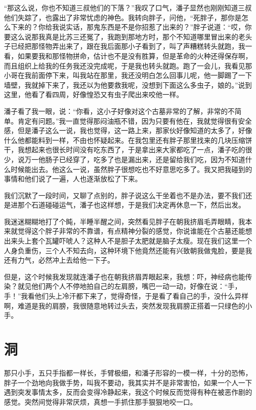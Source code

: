 “那这么说，你也不知道三叔他们的下落？”我叹了口气，潘子显然也刚刚知道三叔他们失踪了，也露出了非常忧虑的神色。我转向胖子，问他，“死胖子，那你是怎么下来的？你给我说实话，那鬼东西是不是你招惹了出来的？”胖子说道：“哎，你要这么说那我真是比苏三还冤了，我跑到那地方时，那个不知道哪里冒出来的老头子已经把那怪物弄出来了，跟在我后面那小子看到了，叫了声糟糕转头就跑，我一看，如果要我和那怪物拼命，估计也不是没有胜算，但是革命的火种还得保存啊，而且组织上给我的任务我还没完成呢，于是我也转头就跑。跑了一会儿，我看见那小哥在我前面停下来，叫我站在那里，我还没明白怎么回事儿呢，他一脚踢了一下墙壁，我就掉下来了，我还以为他要救我呢，没想到下面这么多虫子，娘的。”说到这里，他看了看四周，好像惶恐又有虫子爬出来咬他一样。

潘子看了我一眼，说：“你看，这小子好像对这个古墓非常的了解，非常的不简单。肯定有问题。”我一直觉得那闷油瓶不错，因为只要有他在，我就觉得很有安全感，但是潘子这么一说，我也觉得，这一路上来，那家伙好像知道的太多了，好像什么他都能料到一样，不由也怀疑起来。在我包里还有胖子那里找来的几块压缩饼干，我想起来也很长时间没有吃东西了，于是拿出来大家都吃了一点，潘子吃的很少，说万一他肠子已经穿了，吃多了也是漏出来，还是留给我们吃，因为不知道什么时候能出去。他这么一说，虽然胖子很想吃也不好意思吃多了。我又把我碰到的事情和他们说了一遍，人也逐渐放松了下来。

我们沉默了一段时间，又聊了点别的，胖子说这么干坐着也不是办法，要不我们还是进那个石道碰碰运气，潘子也这样想，于是我们决定再休息一下，然后出发。

我迷迷糊糊地打了个盹，半睡半醒之间，突然看见胖子在朝我挤眉毛弄眼睛，我本来就觉得这个胖子非常的不靠谱，有点精神分裂的感觉，你说谁能在个古墓还能想出来头上套个瓦罐吓唬人？这种人不是胆子太肥就是脑子太瘦。现在我们这里一个人身负重伤，三个人不知去向，这种环境下他竟然还能有兴致朝我做鬼脸，要是我还有力气，必然冲上去给他一下子。

但是，这个时候我发现就连潘子也在朝我挤眉弄眼起来，我想：吓，神经病也能传染？就见他们两个人不停地拍自己的左肩膀，嘴巴一动一动，好像在说：“手，手！”我看他们头上冷汗都下来了，觉得奇怪，于是看了看自己的手，没什么异样啊，难道是我的肩膀，我很随意地转过头去，突然发现我肩膀正搭着一只绿色的小手。

\chapter{洞}

那只小手，五只手指都一样长，手臂极细，和潘子形容的一模一样，十分的恐怖，胖子一个劲地向我做手势，叫我不要动，我其实并不是非常害怕，如果一个人一下遇到突发事情太多，反而会变得冷静起来，我这个时候反而觉得有种在被恶作剧的感觉。突然间觉得非常厌烦，真想一手抓住那手狠狠地咬一口。

